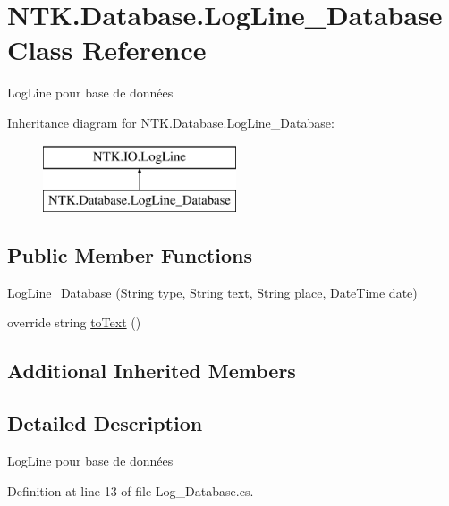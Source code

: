 \hypertarget{class_n_t_k_1_1_database_1_1_log_line___database}{}\section{N\+T\+K.\+Database.\+Log\+Line\+\_\+\+Database Class Reference}
\label{class_n_t_k_1_1_database_1_1_log_line___database}


Log\+Line pour base de données  


Inheritance diagram for N\+T\+K.\+Database.\+Log\+Line\+\_\+\+Database\+:\begin{figure}[H]
\begin{center}
\leavevmode
\includegraphics[height=2.000000cm]{de/d9c/class_n_t_k_1_1_database_1_1_log_line___database}
\end{center}
\end{figure}
\subsection*{Public Member Functions}
\begin{DoxyCompactItemize}
\item 
\mbox{\hyperlink{class_n_t_k_1_1_database_1_1_log_line___database_ae6e065fe23bb73278e4d1dea0bb7525e}{Log\+Line\+\_\+\+Database}} (String type, String text, String place, Date\+Time date)
\item 
override string \mbox{\hyperlink{class_n_t_k_1_1_database_1_1_log_line___database_afc948bed46fbef5c91852ce61c564311}{to\+Text}} ()
\end{DoxyCompactItemize}
\subsection*{Additional Inherited Members}


\subsection{Detailed Description}
Log\+Line pour base de données 



Definition at line 13 of file Log\+\_\+\+Database.\+cs.



